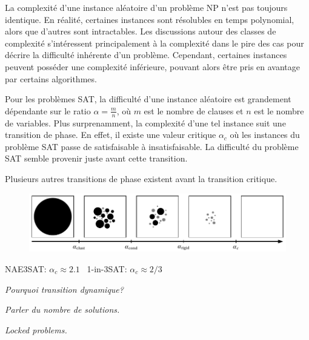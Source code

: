 La complexité d'une instance aléatoire d'un problème \textsf{NP} n'est pas toujours identique. En réalité, certaines instances sont résolubles en temps polynomial, alors que d'autres sont intractables. Les discussions autour des classes de complexité s'intéressent principalement à la complexité dans le pire des cas pour décrire la difficulté inhérente d'un problème. Cependant, certaines instances peuvent posséder une complexité inférieure, pouvant alors être pris en avantage par certains algorithmes. 

Pour les problèmes SAT, la difficulté d'une instance aléatoire est grandement dépendante sur le ratio $\alpha = \frac{m}{n}$, où $m$ est le nombre de clauses et $n$ est le nombre de variables. Plus surprenamment, la complexité d'une tel instance suit une transition de phase. En effet, il existe une valeur critique $\alpha_{c}$ où les instances du problème SAT passe de satisfaisable à insatisfaisable. La difficulté du problème SAT semble provenir juste avant cette transition.

Plusieurs autres transitions de phase existent avant la transition critique. 

\begin{figure}[h]
    \centering
    \includegraphics[width=1\textwidth]{figures/phase-transitions.pdf}
    \caption[Transitions de phase du problème SAT]{}
    \label{fig:...}
\end{figure}

NAE3SAT: $\alpha_{c} \approx 2.1$~\cite{achlioptasPhaseTransition1ink2001}
1-in-3SAT: $\alpha_{c} \approx 2/3$~\cite{raymondPhaseDiagram1in32007}

\textcolor{mydarkred}{\textit{Pourquoi transition dynamique?}}

\textcolor{mydarkred}{\textit{Parler du nombre de solutions.}}

\textcolor{mydarkred}{\textit{Locked problems.}}